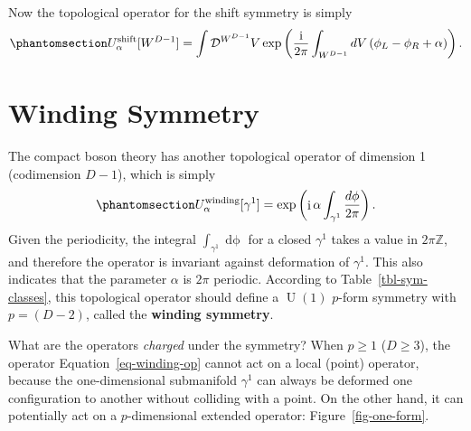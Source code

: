 \documentclass[
  letterpaper,
  DIV=11,
  numbers=noendperiod]{scrreport}
\DeclareMathOperator{\U}{U}
\DeclareMathOperator{\imunit}{i}
\newcommand{\stdim}{D}
\begin{document}
Now the topological operator for the shift symmetry is simply
\begin{equation}\phantomsection\label{eq-shift-compact-boson}{
    U_\alpha^\text{shift}[{W^{\stdim-1}}] = \int \mathcal{D}^{W^{\stdim-1}}V \exp\left(\frac{\imunit}{2\pi}\int_{W^{\stdim-1}} \mathop{dV}\left(\phi_L-\phi_R + \alpha\right)\right).
}\end{equation}

\section{Winding Symmetry}\label{winding-symmetry}

The compact boson theory has another topological operator of dimension 1
(codimension \(\stdim-1\)), which is simply
\begin{equation}\phantomsection\label{eq-winding-op}{
U^\text{winding}_\alpha[\gamma^1] = \exp\left(\imunit\alpha \int_{\gamma^1}\frac{\mathop{d\phi}}{2\pi}\right).
}\end{equation} Given the periodicity, the integral
\(\int_{\gamma^1}\mathop{d\phi}\) for a closed \(\gamma^1\) takes a
value in \(2\pi \mathbb{Z}\), and therefore the operator is invariant
against deformation of \(\gamma^1\). This also indicates that the
parameter \(\alpha\) is \(2\pi\) periodic. According to
Table~\ref{tbl-sym-classes}, this topological operator should define a
\(\U(1)\) \(p\)-form symmetry with \(p=(\stdim-2)\), called the
\textbf{winding symmetry}.

What are the operators \emph{charged} under the symmetry? When
\(p \ge 1\) (\(\stdim\ge 3\)), the operator Equation~\ref{eq-winding-op}
cannot act on a local (point) operator, because the one-dimensional
submanifold \(\gamma^1\) can always be deformed one configuration to
another without colliding with a point. On the other hand, it can
potentially act on a \(p\)-dimensional extended operator:
Figure~\ref{fig-one-form}.
\end{document}
